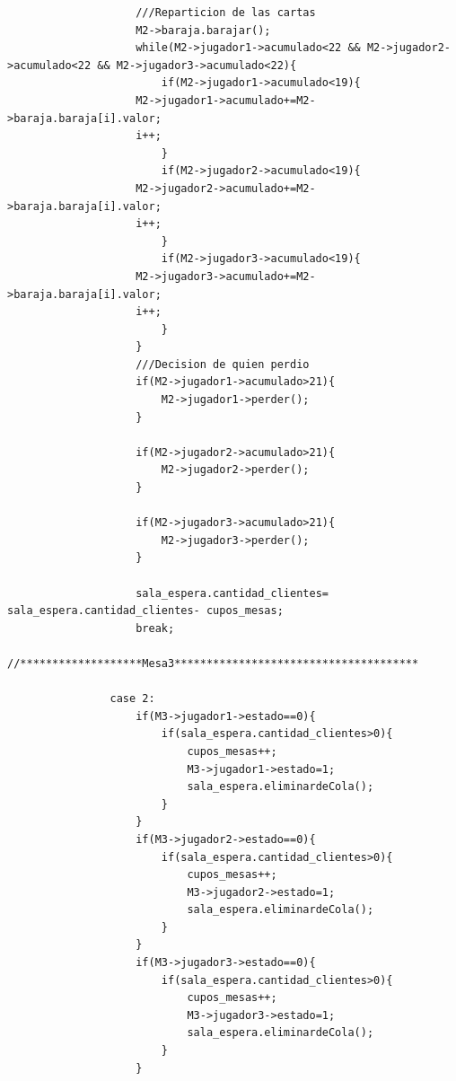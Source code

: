 \documentclass[11pt]{article}
\begin{document}
\begin{lstlisting}
                    ///Reparticion de las cartas
                    M2->baraja.barajar();                    
                    while(M2->jugador1->acumulado<22 && M2->jugador2->acumulado<22 && M2->jugador3->acumulado<22){
                        if(M2->jugador1->acumulado<19){
                    M2->jugador1->acumulado+=M2->baraja.baraja[i].valor;
                    i++;
                        }
                        if(M2->jugador2->acumulado<19){
                    M2->jugador2->acumulado+=M2->baraja.baraja[i].valor;
                    i++;
                        }
                        if(M2->jugador3->acumulado<19){
                    M2->jugador3->acumulado+=M2->baraja.baraja[i].valor;
                    i++;
                        }
                    }
                    ///Decision de quien perdio
                    if(M2->jugador1->acumulado>21){
                        M2->jugador1->perder();
                    }

                    if(M2->jugador2->acumulado>21){
                        M2->jugador2->perder();
                    }

                    if(M2->jugador3->acumulado>21){
                        M2->jugador3->perder();
                    }                

                    sala_espera.cantidad_clientes= sala_espera.cantidad_clientes- cupos_mesas;
                    break;
                //*******************Mesa3**************************************

                case 2:
                    if(M3->jugador1->estado==0){
                        if(sala_espera.cantidad_clientes>0){
                            cupos_mesas++;
                            M3->jugador1->estado=1;
                            sala_espera.eliminardeCola();
                        }
                    }
                    if(M3->jugador2->estado==0){
                        if(sala_espera.cantidad_clientes>0){
                            cupos_mesas++;
                            M3->jugador2->estado=1;
                            sala_espera.eliminardeCola();
                        }
                    }
                    if(M3->jugador3->estado==0){
                        if(sala_espera.cantidad_clientes>0){
                            cupos_mesas++;
                            M3->jugador3->estado=1;
                            sala_espera.eliminardeCola();
                        }
                    }


\end{lstlisting}
\end{document}
